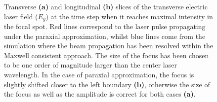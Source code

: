 \begin{figure}[h!]
	\centering
	\hspace{1mm}
	\caption{Transverse \textbf{(a)} and longitudinal \textbf{(b)} slices of the transverse electric laser field ($ E_{y} $) at the time step when it reaches maximal intensity in the focal spot. Red lines correspond to the laser pulse propagating under the paraxial approximation, whilst blue lines come from the simulation where the beam propagation has been resolved within the Maxwell consistent approach. The size of the focus has been chosen to be one order of magnitude larger than the center laser wavelength. In the case of paraxial approximation, the focus is slightly shifted closer to the left boundary \textbf{(b)}, otherwise the size of the focus as well as the amplitude is correct for both cases \textbf{(a)}.}
	\label{fig:6}
\end{figure}
